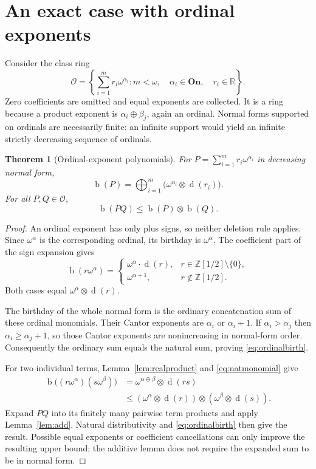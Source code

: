 \documentclass[11pt,letterpaper]{article}
\numberwithin{equation}{section}
\newtheorem{theorem}{Theorem}[section]
\theoremstyle{definition}
\theoremstyle{remark}
\newcommand{\On}{\mathbf{On}}
\newcommand{\R}{\mathbb{R}}
\newcommand{\D}{\mathbb{Z}[1/2]}
\newcommand{\OrdPoly}{\mathcal{O}}
\newcommand{\bd}{\operatorname{b}}
\newcommand{\rd}{\operatorname{d}}
\newcommand{\ns}{\mathbin{\oplus}}
\newcommand{\np}{\mathbin{\otimes}}
\newcommand{\bigns}{\mathop{\bigoplus}}
\begin{document}
\section{An exact case with ordinal exponents}
\label{sec:ordinalpoly}
Consider the class ring
\[
 \OrdPoly=\left\{\sum_{i=1}^{m}r_i\omega^{\alpha_i}:
  m<\omega,\quad\alpha_i\in\On,\quad r_i\in\R\right\}.
\]
Zero coefficients are omitted and equal exponents are collected. It is a ring
because a product exponent is $\alpha_i\oplus\beta_j$, again an ordinal.
Normal forms supported on ordinals are necessarily finite: an infinite support
would yield an infinite strictly decreasing sequence of ordinals.

\begin{theorem}[Ordinal-exponent polynomials]\label{thm:ordinalpoly}
For $P=\sum_{i=1}^m r_i\omega^{\alpha_i}$ in decreasing normal form,
\begin{equation}\label{eq:ordinalbirth}
 \bd(P)=\bigns_{i=1}^m
       \bigl(\omega^{\alpha_i}\np\rd(r_i)\bigr).
\end{equation}
For all $P,Q\in\OrdPoly$,
\[
 \bd(PQ)\leq\bd(P)\np\bd(Q).
\]
\end{theorem}
\begin{proof}
An ordinal exponent has only plus signs, so neither deletion rule applies.
Since $\omega^\alpha$ is the corresponding ordinal, its birthday is
$\omega^\alpha$. The coefficient part of the sign expansion gives
\[
 \bd(r\omega^\alpha)=
 \begin{cases}
  \omega^\alpha\cdot\rd(r),&r\in\D\setminus\{0\},\\
  \omega^{\alpha+1},&r\notin\D.
 \end{cases}
\]
Both cases equal $\omega^\alpha\otimes\rd(r)$.

The birthday of the whole normal form is the ordinary concatenation sum of
these ordinal monomials. Their Cantor exponents are $\alpha_i$ or
$\alpha_i+1$. If $\alpha_i>\alpha_j$ then $\alpha_i\geq\alpha_j+1$, so those
Cantor exponents are nonincreasing in normal-form order. Consequently the
ordinary sum equals the natural sum, proving \eqref{eq:ordinalbirth}.

For two individual terms, Lemma~\ref{lem:realproduct} and
\eqref{eq:natmonomial} give
\begin{align*}
 \bd\bigl((r\omega^\alpha)(s\omega^\beta)\bigr)
 &=\omega^{\alpha\ns\beta}\np\rd(rs)\\
 &\leq(\omega^\alpha\np\rd(r))
        \np(\omega^\beta\np\rd(s)).
\end{align*}
Expand $PQ$ into its finitely many pairwise term products and apply
Lemma~\ref{lem:add}. Natural distributivity and
\eqref{eq:ordinalbirth} then give the result. Possible equal exponents or
coefficient cancellations can only improve the resulting upper bound; the
additive lemma does not require the expanded sum to be in normal form.
\end{proof}
\end{document}

